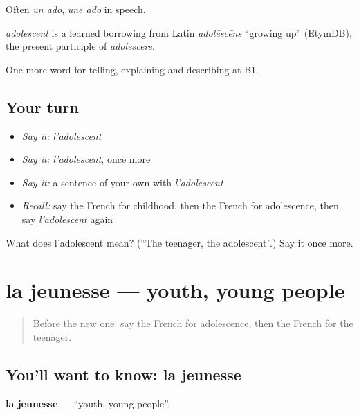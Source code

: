 Often \emph{un ado}, \emph{une ado} in speech.

\begin{cousinweb}
\emph{adolescent} is a learned borrowing from Latin \emph{adolēscēns} \textquotedblleft{}growing up\textquotedblright{} (EtymDB), the present participle of \emph{adolēscere}.
\end{cousinweb}

\begin{grammarlens}[title={What you've built}]
One more word for telling, explaining and describing at B1.
\end{grammarlens}

\subsection*{Your turn}
\begin{itemize}
\raggedright
  \item \emph{Say it:} \emph{l'adolescent}
  \item \emph{Say it:} \emph{l'adolescent}, once more
  \item \emph{Say it:} a sentence of your own with \emph{l'adolescent}
  \item \emph{Recall:} say the French for childhood, then the French for adolescence, then say \emph{l'adolescent} again
\end{itemize}

\begin{tcolorbox}[breakable,colback=teal!4,colframe=teal!35!black,title={Before you move on}]
What does l'adolescent mean? (\textquotedblleft{}The teenager, the adolescent\textquotedblright{}.) Say it once more.
\end{tcolorbox}
\section[la jeunesse]{la jeunesse — youth, young people}

\label{lesson:FR-C310-jeunesse}



\begin{quote}
Before the new one: say the French for adolescence, then the French for the teenager.
\end{quote}

\subsection*{You'll want to know: la jeunesse}
\textbf{la jeunesse} — \textquotedblleft{}youth, young people\textquotedblright{}.

